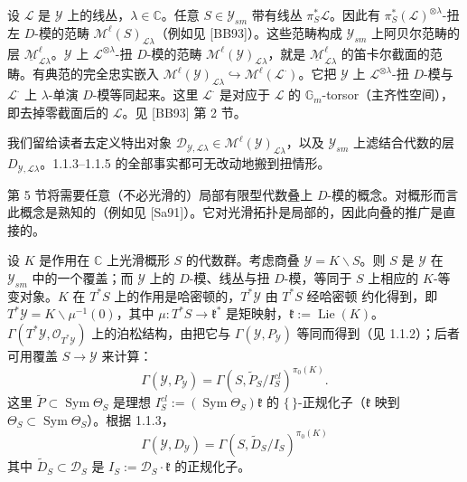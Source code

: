  设 $\mathcal{L}$ 是 $\mathcal{Y}$ 上的线丛，$\lambda\in\mathbb{C}$。任意 $S\in\mathcal{Y}_{sm}$ 带有线丛 $\pi_S^{*}\mathcal{L}$。因此有 $\pi_S^{*}(\mathcal{L})^{\otimes\lambda}$-扭左 $D$-模的范畴 $\mathcal{M}^{\ell}(S)_{\mathcal{L}\lambda}$（例如见 [BB93]）。这些范畴构成 $\mathcal{Y}_{sm}$ 上阿贝尔范畴的层 $\underline{\mathcal{M}}^{\ell}_{\mathcal{L}\lambda}$。$\mathcal{Y}$ 上 $\mathcal{L}^{\otimes\lambda}$-扭 $D$-模的范畴 $\mathcal{M}^{\ell}(\mathcal{Y})_{\mathcal{L}\lambda}$，就是 $\underline{\mathcal{M}}^{\ell}_{\mathcal{L}\lambda}$ 的笛卡尔截面的范畴。有典范的完全忠实嵌入 $\mathcal{M}^{\ell}(\mathcal{Y})_{\mathcal{L}\lambda}\hookrightarrow\mathcal{M}^{\ell}(\mathcal{L}^{\cdot})$。它把 $\mathcal{Y}$ 上 $\mathcal{L}^{\otimes\lambda}$-扭 $D$-模与 $\mathcal{L}^{\cdot}$ 上 $\lambda$-单演 $D$-模等同起来。这里 $\mathcal{L}^{\cdot}$ 是对应于 $\mathcal{L}$ 的 $\mathbb{G}_m$-torsor（主齐性空间），即去掉零截面后的 $\mathcal{L}$。见 [BB93] 第 2 节。

我们留给读者去定义特出对象 $\mathcal{D}_{\mathcal{Y},\mathcal{L}\lambda}\in\mathcal{M}^{\ell}(\mathcal{Y})_{\mathcal{L}\lambda}$，以及 $\mathcal{Y}_{sm}$ 上滤结合代数的层 $D_{\mathcal{Y},\mathcal{L}\lambda}$。1.1.3--1.1.5 的全部事实都可无改动地搬到扭情形。

 第 5 节将需要任意（不必光滑的）局部有限型代数叠上 $D$-模的概念。对概形而言此概念是熟知的（例如见 [Sa91]）。它对光滑拓扑是局部的，因此向叠的推广是直接的。


 设 $K$ 是作用在 $\mathbb{C}$ 上光滑概形 $S$ 的代数群。考虑商叠 $\mathcal{Y}=K\backslash S$。则 $S$ 是 $\mathcal{Y}$ 在 $\mathcal{Y}_{sm}$ 中的一个覆盖；而 $\mathcal{Y}$ 上的 $D$-模、线丛与扭 $D$-模，等同于 $S$ 上相应的 $K$-等变对象。$K$ 在 $T^{*}S$ 上的作用是哈密顿的，$T^{*}\mathcal{Y}$ 由 $T^{*}S$ 经哈密顿%
约化得到，即 $T^{*}\mathcal{Y}=K\backslash\mu^{-1}(0)$，其中 $\mu:T^{*}S\to\mathfrak{k}^{*}$ 是矩映射，$\mathfrak{k}:=\operatorname{Lie}(K)$。$\Gamma(T^{*}\mathcal{Y},\mathcal{O}_{T^{*}\mathcal{Y}})$ 上的泊松结构，由把它与 $\Gamma(\mathcal{Y},P_{\mathcal{Y}})$ 等同而得到（见 1.1.2）；后者可用覆盖 $S\to\mathcal{Y}$ 来计算：
\begin{equation}\tag{8}
\Gamma(\mathcal{Y},P_{\mathcal{Y}})=\Gamma(S,\tilde{P}_S/I_S^{cl})^{\pi_0(K)}.
\end{equation}
这里 $\tilde{P}\subset\operatorname{Sym}\Theta_S$ 是理想 $I_S^{cl}:=(\operatorname{Sym}\Theta_S)\mathfrak{k}$ 的 $\{\,\}$-正规化子（$\mathfrak{k}$ 映到 $\Theta_S\subset\operatorname{Sym}\Theta_S$）。根据 1.1.3，
\begin{equation}\tag{9}
\Gamma(\mathcal{Y},D_{\mathcal{Y}})=\Gamma(S,\tilde{D}_S/I_S)^{\pi_0(K)}
\end{equation}
其中 $\tilde{D}_S\subset\mathcal{D}_S$ 是 $I_S:=\mathcal{D}_S\cdot\mathfrak{k}$ 的正规化子。

